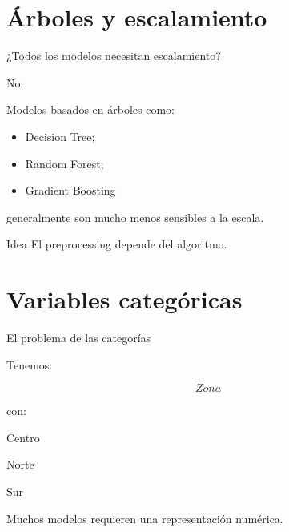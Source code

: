 \documentclass[aspectratio=169,11pt]{beamer}
\begin{document}
\section{Árboles y escalamiento}

\begin{frame}{¿Todos los modelos necesitan escalamiento?}

No.

Modelos basados en árboles como:

\begin{itemize}

    \item Decision Tree;

    \item Random Forest;

    \item Gradient Boosting

\end{itemize}

generalmente son mucho menos sensibles a la escala.

\vspace{0.4cm}

\begin{block}{Idea}
El preprocessing depende del algoritmo.
\end{block}

\end{frame}

\section{Variables categóricas}

\begin{frame}{El problema de las categorías}

Tenemos:

\[
Zona
\]

con:

\begin{center}

Centro

Norte

Sur
\end{center}

Muchos modelos requieren una representación numérica.

\end{frame}
\end{document}
